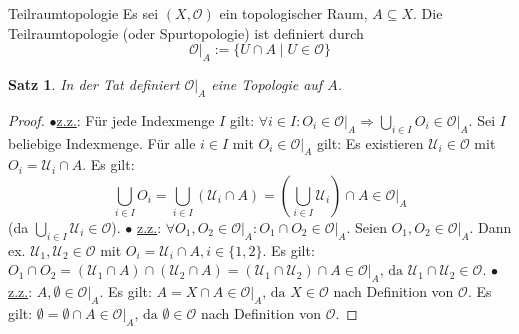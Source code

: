 \documentclass[a4paper,11pt,notitlepage]{report}
\newtheorem{theorem}{Satz}[chapter]
\newcommand{\OO}{{\ensuremath{\mathcal{O}}}}
\begin{document}
\begin{section}{Teilraumtopologie}
	Es sei $(X, \OO)$ ein topologischer Raum, $A \subseteq X$.
	\newline
	Die Teilraumtopologie (oder Spurtopologie) ist definiert durch
	$$\OO \big |_{A} := \{U \cap A \mid U \in \OO\} $$
	
	\begin{theorem}
		In der Tat definiert $\OO \big |_{A}$ eine Topologie auf $A$.
	\end{theorem}
	
	\begin{proof}
			$\bullet$\underline{z.z.}: Für jede Indexmenge $I$ gilt:
				$\forall i \in I \colon O_i \in \OO \big |_{A} \Rightarrow \bigcup\limits_{i \in I}{O_i} \in \OO \big |_{A}.$
			\newline
			Sei $I$ beliebige Indexmenge. Für alle $i \in I$ mit $O_i \in \OO \big |_{A}$ gilt:
			Es existieren $\mathcal{U}_i \in \OO$ mit $O_i= \mathcal{U}_i \cap A$.
			Es gilt:
			$$\bigcup\limits_{i \in I}{O_i} = \bigcup\limits_{i \in I}{(\mathcal{U}_i \cap A) } = (\bigcup\limits_{i \in I}{\mathcal{U}_i})\cap A \in \OO \big |_{A}$$ (da $\bigcup\limits_{i \in I}{\mathcal{U}_i} \in \OO$).
			\newline
			$\bullet$ \underline{z.z.}: $\forall O_1, O_2 \in \OO \big |_{A} \colon O_1 \cap O_2 \in \OO \big |_{A}.$
			\newline
			Seien $O_1, O_2 \in \OO \big |_{A}$. Dann ex. $\mathcal{U}_1, \mathcal{U}_2 \in \OO$ mit $O_i = \mathcal{U}_i \cap A, i \in \{1,2\}.$ Es gilt:
			$O_1 \cap O_2 = (\mathcal{U}_1 \cap A) \cap (\mathcal{U}_2 \cap A) = (\mathcal{U}_1 \cap \mathcal{U}_2) \cap A \in \OO \big |_{A} \text{, da } \mathcal{U}_1 \cap \mathcal{U}_2 \in \OO.$
			\newline
			$\bullet$ \underline{z.z.}: $A, \emptyset \in \OO \big |_{A}.$
			\newline
			Es gilt: $A = X \cap A \in \OO \big |_{A}\text{, da } X \in \OO$ nach Definition von $\OO$. 
			\newline
			Es gilt: $\emptyset = \emptyset \cap A \in \OO \big |_{A} \text{, da } \emptyset \in \OO$ nach Definition von $\OO$.
	\end{proof}
\end{section}
\end{document}
